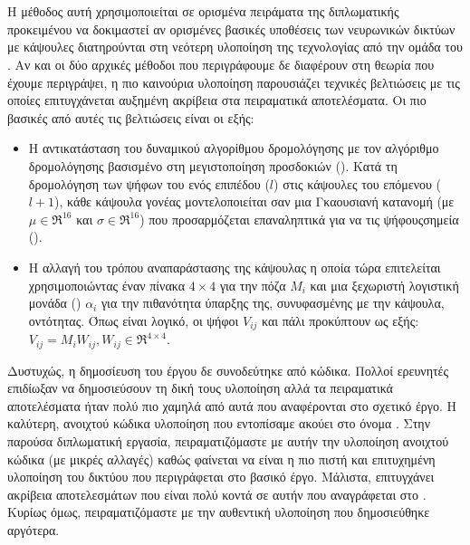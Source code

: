 \section{}

Η μέθοδος αυτή χρησιμοποιείται σε ορισμένα πειράματα της διπλωματικής προκειμένου να δοκιμαστεί αν ορισμένες βασικές υποθέσεις των νευρωνικών δικτύων με κάψουλες διατηρούνται στη νεότερη υλοποίηση της τεχνολογίας από την ομάδα του . Αν και οι δύο αρχικές μέθοδοι που περιγράφουμε δε διαφέρουν στη θεωρία που έχουμε περιγράψει, η πιο καινούρια υλοποίηση παρουσιάζει τεχνικές βελτιώσεις με τις οποίες επιτυγχάνεται αυξημένη ακρίβεια στα πειραματικά αποτελέσματα. Οι πιο βασικές από αυτές τις βελτιώσεις είναι οι εξής:
\begin{itemize}
  \item Η αντικατάσταση του δυναμικού αλγορίθμου δρομολόγησης με τον αλγόριθμο δρομολόγησης βασισμένο στη μεγιστοποίηση προσδοκιών (). Κατά τη δρομολόγηση των ψήφων του ενός επιπέδου ($l$) στις κάψουλες του επόμενου ($l+1$), κάθε κάψουλα γονέας μοντελοποιείται σαν μια Γκαουσιανή κατανομή (με $\mu \in \Re^{16}$ και $\sigma \in \Re^{16}$) που προσαρμόζεται επαναληπτικά για να  τις ψήφους\textendash σημεία ().
  \item Η αλλαγή του τρόπου αναπαράστασης της κάψουλας η οποία τώρα επιτελείται χρησιμοποιώντας έναν πίνακα $4\times 4$ για την πόζα $M_i$ και μια ξεχωριστή λογιστική μονάδα () $\alpha_i$ για την πιθανότητα ύπαρξης της, συνυφασμένης με την κάψουλα, οντότητας. Όπως είναι λογικό, οι ψήφοι $V_{ij}$ και πάλι προκύπτουν ως εξής: $V_{ij} = M_iW_{ij}, W_{ij} \in \Re^{4\times 4}$.
\end{itemize}

Δυστυχώς, η δημοσίευση του έργου \cite{hinton2018matrix} δε συνοδεύτηκε από κώδικα. Πολλοί ερευνητές επιδίωξαν να δημοσιεύσουν τη δική τους υλοποίηση αλλά τα πειραματικά αποτελέσματα ήταν πολύ πιο χαμηλά από αυτά που αναφέρονται στο σχετικό έργο. Η καλύτερη, ανοιχτού κώδικα υλοποίηση που εντοπίσαμε ακούει στο όνομα  \cite{gritzman2019avoiding}. Στην παρούσα διπλωματική εργασία, πειραματιζόμαστε με αυτήν την υλοποίηση ανοιχτού κώδικα (με μικρές αλλαγές) καθώς φαίνεται να είναι η πιο πιστή και επιτυχημένη υλοποίηση του δικτύου που περιγράφεται στο βασικό έργο. Μάλιστα, επιτυγχάνει ακρίβεια αποτελεσμάτων που είναι πολύ κοντά σε αυτήν που αναγράφεται στο \cite{hinton2018matrix}. Κυρίως όμως, πειραματιζόμαστε με την αυθεντική υλοποίηση που δημοσιεύθηκε αργότερα.\par

